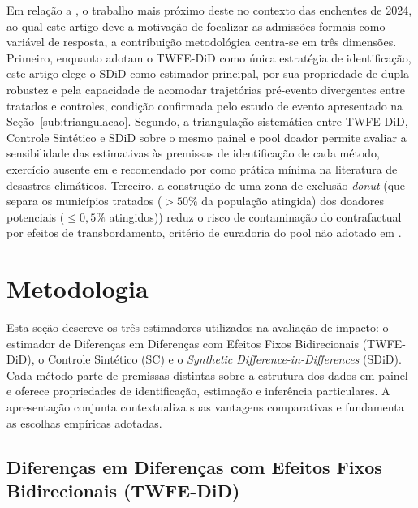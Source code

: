 \documentclass[a4paper,12pt]{article}
\begin{document}
Em relação a , o trabalho mais próximo deste no contexto
das enchentes de 2024, ao qual este artigo deve a motivação de focalizar as admissões
formais como variável de resposta, a contribuição metodológica centra-se em três
dimensões. Primeiro, enquanto  adotam o TWFE-DiD como
única estratégia de identificação, este artigo elege o SDiD como estimador principal,
por sua propriedade de dupla robustez e pela capacidade de acomodar trajetórias
pré-evento divergentes entre tratados e controles, condição confirmada pelo estudo
de evento apresentado na Seção~\ref{sub:triangulacao}. Segundo, a triangulação
sistemática entre TWFE-DiD, Controle Sintético e SDiD sobre o mesmo painel e pool
doador permite avaliar a sensibilidade das estimativas às premissas de identificação
de cada método, exercício ausente em  e recomendado por
 como prática mínima na literatura de desastres climáticos.
Terceiro, a construção de uma zona de exclusão \textit{donut} (que separa os
municípios tratados ($>50\%$ da população atingida) dos doadores potenciais
($\leq 0{,}5\%$ atingidos)) reduz o risco de contaminação do contrafactual por
efeitos de transbordamento, critério de curadoria do pool não adotado em
.


\section{Metodologia}
\label{sec:metodologia}

Esta seção descreve os três estimadores utilizados na avaliação de impacto: o estimador
de Diferenças em Diferenças com Efeitos Fixos Bidirecionais (TWFE-DiD), o Controle
Sintético (SC) e o \textit{Synthetic Difference-in-Differences} (SDiD). Cada método parte
de premissas distintas sobre a estrutura dos dados em painel e oferece propriedades de
identificação, estimação e inferência particulares. A apresentação conjunta contextualiza
suas vantagens comparativas e fundamenta as escolhas empíricas adotadas.

\subsection{Diferenças em Diferenças com Efeitos Fixos Bidirecionais (TWFE-DiD)}
\end{document}
